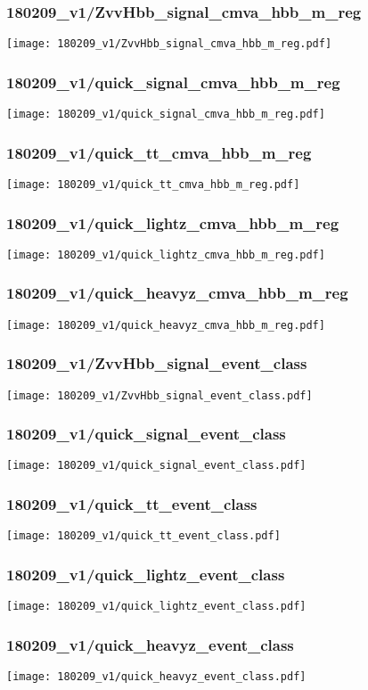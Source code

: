 \begin{frame}
   \frametitle{\small 180209\_v1/ZvvHbb\_signal\_cmva\_hbb\_m\_reg}
   \centering
   \texttt{[image: 180209\_v1/ZvvHbb\_signal\_cmva\_hbb\_m\_reg.pdf]}
\end{frame}

\begin{frame}
   \frametitle{\small 180209\_v1/quick\_signal\_cmva\_hbb\_m\_reg}
   \centering
   \texttt{[image: 180209\_v1/quick\_signal\_cmva\_hbb\_m\_reg.pdf]}
\end{frame}

\begin{frame}
   \frametitle{\small 180209\_v1/quick\_tt\_cmva\_hbb\_m\_reg}
   \centering
   \texttt{[image: 180209\_v1/quick\_tt\_cmva\_hbb\_m\_reg.pdf]}
\end{frame}

\begin{frame}
   \frametitle{\small 180209\_v1/quick\_lightz\_cmva\_hbb\_m\_reg}
   \centering
   \texttt{[image: 180209\_v1/quick\_lightz\_cmva\_hbb\_m\_reg.pdf]}
\end{frame}

\begin{frame}
   \frametitle{\small 180209\_v1/quick\_heavyz\_cmva\_hbb\_m\_reg}
   \centering
   \texttt{[image: 180209\_v1/quick\_heavyz\_cmva\_hbb\_m\_reg.pdf]}
\end{frame}

\begin{frame}
   \frametitle{\small 180209\_v1/ZvvHbb\_signal\_event\_class}
   \centering
   \texttt{[image: 180209\_v1/ZvvHbb\_signal\_event\_class.pdf]}
\end{frame}

\begin{frame}
   \frametitle{\small 180209\_v1/quick\_signal\_event\_class}
   \centering
   \texttt{[image: 180209\_v1/quick\_signal\_event\_class.pdf]}
\end{frame}

\begin{frame}
   \frametitle{\small 180209\_v1/quick\_tt\_event\_class}
   \centering
   \texttt{[image: 180209\_v1/quick\_tt\_event\_class.pdf]}
\end{frame}

\begin{frame}
   \frametitle{\small 180209\_v1/quick\_lightz\_event\_class}
   \centering
   \texttt{[image: 180209\_v1/quick\_lightz\_event\_class.pdf]}
\end{frame}

\begin{frame}
   \frametitle{\small 180209\_v1/quick\_heavyz\_event\_class}
   \centering
   \texttt{[image: 180209\_v1/quick\_heavyz\_event\_class.pdf]}
\end{frame}

